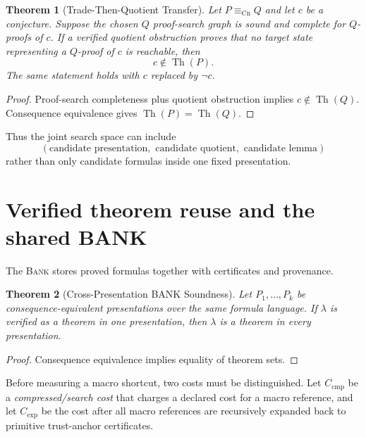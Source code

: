 \documentclass[11pt]{article}
\newtheorem{theorem}{Theorem}[section]
\theoremstyle{definition}
\theoremstyle{remark}
\newcommand{\Th}{\operatorname{Th}}
\newcommand{\BANK}{\textsc{Bank}}
\newcommand{\equivCn}{\equiv_{\mathrm{Cn}}}
\begin{document}
\begin{theorem}[Trade-Then-Quotient Transfer]\label{thm:tradequotient}
Let $P\equivCn Q$ and let $c$ be a conjecture. Suppose the chosen $Q$ proof-search graph is sound and complete for $Q$-proofs of $c$. If a verified quotient obstruction proves that no target state representing a $Q$-proof of $c$ is reachable, then
\[
c\notin\Th(P).
\]
The same statement holds with $c$ replaced by $\neg c$.
\end{theorem}

\begin{proof}
Proof-search completeness plus quotient obstruction implies $c\notin\Th(Q)$. Consequence equivalence gives $\Th(P)=\Th(Q)$.
\end{proof}

Thus the joint search space can include
\[
(\text{candidate presentation},\text{ candidate quotient},\text{ candidate lemma})
\]
rather than only candidate formulas inside one fixed presentation.

\section{Verified theorem reuse and the shared BANK}
The \BANK{} stores proved formulas together with certificates and provenance.

\begin{theorem}[Cross-Presentation BANK Soundness]
Let $P_1,\ldots,P_k$ be consequence-equivalent presentations over the same formula language. If $\lambda$ is verified as a theorem in one presentation, then $\lambda$ is a theorem in every presentation.
\end{theorem}

\begin{proof}
Consequence equivalence implies equality of theorem sets.
\end{proof}

Before measuring a macro shortcut, two costs must be distinguished. Let $C_{\mathrm{cmp}}$ be a \emph{compressed/search cost} that charges a declared cost for a macro reference, and let $C_{\mathrm{exp}}$ be the cost after all macro references are recursively expanded back to primitive trust-anchor certificates.
\end{document}
